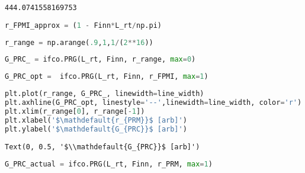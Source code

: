 \begin{spacing}{1.2}\begin{lstlisting}
444.0741558169753
\end{lstlisting}\end{spacing}

\begin{spacing}{1.2}\begin{lstlisting}[frame=single, language=Python]
r_FPMI_approx = (1 - Finn*L_rt/np.pi)
\end{lstlisting}\end{spacing}

\begin{spacing}{1.2}\begin{lstlisting}[frame=single, language=Python]
r_range = np.arange(.9,1,1/(2**16))
\end{lstlisting}\end{spacing}

\begin{spacing}{1.2}\begin{lstlisting}[frame=single, language=Python]
G_PRC_ = ifco.PRG(L_rt, Finn, r_range, max=0) 
\end{lstlisting}\end{spacing}

\begin{spacing}{1.2}\begin{lstlisting}[frame=single, language=Python]
G_PRC_opt =  ifco.PRG(L_rt, Finn, r_FPMI, max=1)
\end{lstlisting}\end{spacing}

\begin{spacing}{1.2}\begin{lstlisting}[frame=single, language=Python]
plt.plot(r_range, G_PRC_, linewidth=line_width)
plt.axhline(G_PRC_opt, linestyle='--',linewidth=line_width, color='r')
plt.xlim(r_range[0], r_range[-1])
plt.xlabel('$\mathdefault{r_{PRM}}$ [arb]')
plt.ylabel('$\mathdefault{G_{PRC}}$ [arb]')
\end{lstlisting}\end{spacing}

\begin{spacing}{1.2}\begin{lstlisting}
Text(0, 0.5, '$\\mathdefault{G_{PRC}}$ [arb]')
\end{lstlisting}\end{spacing}

\begin{spacing}{1.2}\begin{lstlisting}[frame=single, language=Python]
G_PRC_actual = ifco.PRG(L_rt, Finn, r_PRM, max=1)
\end{lstlisting}\end{spacing}

